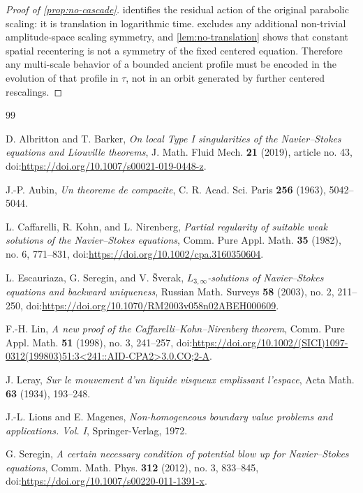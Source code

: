 \documentclass[11pt]{amsart}
\theoremstyle{plain}
\theoremstyle{definition}
\theoremstyle{remark}
\numberwithin{equation}{section}
\begin{document}
\begin{proof}[Proof of \cref{prop:no-cascade}]
 identifies the residual action of the original
parabolic scaling: it is translation in logarithmic time.  
excludes any additional non-trivial amplitude-space scaling symmetry, and
\cref{lem:no-translation} shows that constant spatial recentering is not a
symmetry of the fixed centered equation.  Therefore any multi-scale behavior of
a bounded ancient profile must be encoded in the evolution of that profile in
\(\tau\), not in an orbit generated by further centered rescalings.
\end{proof}

\begin{thebibliography}{99}

D. Albritton and T. Barker,
\emph{On local Type I singularities of the Navier--Stokes equations and
Liouville theorems},
J. Math. Fluid Mech. \textbf{21} (2019), article no. 43,
doi:\url{https://doi.org/10.1007/s00021-019-0448-z}.

J.-P. Aubin,
\emph{Un theoreme de compacite},
C. R. Acad. Sci. Paris \textbf{256} (1963), 5042--5044.

L. Caffarelli, R. Kohn, and L. Nirenberg,
\emph{Partial regularity of suitable weak solutions of the Navier--Stokes equations},
Comm. Pure Appl. Math. \textbf{35} (1982), no. 6, 771--831,
doi:\url{https://doi.org/10.1002/cpa.3160350604}.

L. Escauriaza, G. Seregin, and V. \v{S}verak,
\emph{\(L_{3,\infty}\)-solutions of Navier--Stokes equations and backward uniqueness},
Russian Math. Surveys \textbf{58} (2003), no. 2, 211--250,
doi:\url{https://doi.org/10.1070/RM2003v058n02ABEH000609}.

F.-H. Lin,
\emph{A new proof of the Caffarelli--Kohn--Nirenberg theorem},
Comm. Pure Appl. Math. \textbf{51} (1998), no. 3, 241--257,
doi:\url{https://doi.org/10.1002/(SICI)1097-0312(199803)51:3<241::AID-CPA2>3.0.CO;2-A}.

J. Leray,
\emph{Sur le mouvement d'un liquide visqueux emplissant l'espace},
Acta Math. \textbf{63} (1934), 193--248.

J.-L. Lions and E. Magenes,
\emph{Non-homogeneous boundary value problems and applications. Vol. I},
Springer-Verlag, 1972.

G. Seregin,
\emph{A certain necessary condition of potential blow up for Navier--Stokes equations},
Comm. Math. Phys. \textbf{312} (2012), no. 3, 833--845,
doi:\url{https://doi.org/10.1007/s00220-011-1391-x}.


\end{thebibliography}
\end{document}
